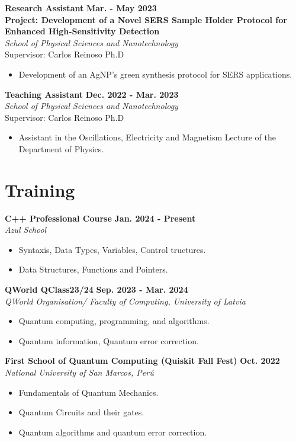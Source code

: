 \documentclass[a4paper,12pt]{article}
\begin{document}
\textbf{Research Assistant} \hfill {\textbf{Mar. - May 2023}}\\
\textbf{Project: Development of a Novel SERS Sample Holder Protocol for Enhanced High-Sensitivity Detection}\\
\emph{School of Physical Sciences and Nanotechnology}\\
Supervisor: Carlos Reinoso Ph.D
\begin{itemize}
    \item Development of an AgNP's green synthesis protocol for SERS applications.
\end{itemize}

\textbf{Teaching Assistant}
\hfill {\textbf{Dec. 2022 - Mar. 2023}}\\
\emph{School of Physical Sciences and Nanotechnology}\\
Supervisor: Carlos Reinoso Ph.D
\begin{itemize}
    \item Assistant in the Oscillations, Electricity and Magnetism Lecture of the Department of Physics.
\end{itemize}
\section{Training}
\textbf{C++ Professional Course} \hfill{\textbf{Jan. 2024 - Present}}\\
\emph{Azul School }
\begin{itemize}
    \item Syntaxis, Data Types, Variables, Control tructures.
    \item Data Structures, Functions and Pointers.
\end{itemize}

\textbf{ QWorld QClass23/24} \hfill{\textbf{Sep. 2023 - Mar. 2024}}\\
\emph{QWorld Organisation/ Faculty of Computing, University of Latvia }
\begin{itemize}
    \item Quantum computing, programming, and algorithms.
    \item Quantum information, Quantum error correction.
\end{itemize}

\textbf{First School of Quantum Computing (Quiskit Fall Fest)} \hfill {\textbf{Oct. 2022}}\\
\emph{National University of San Marcos, Perú}
\begin{itemize}
    \item Fundamentals of Quantum Mechanics.
    \item Quantum Circuits and their gates.
    \item Quantum algorithms and quantum error correction.
\end{itemize}
\end{document}
